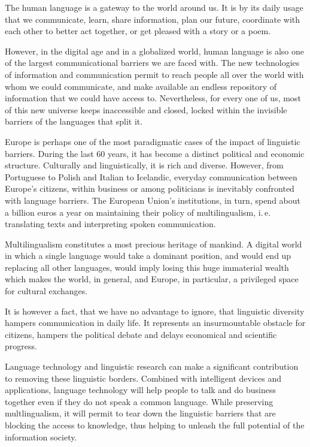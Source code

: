 \begin{multicols}{2}

The human language is a gateway to the world around us.
It is by its daily usage that we communicate, learn, share information,
plan our future, coordinate with each other to better act together,
or get pleased with a story or a poem.

However, in the digital age and in a globalized world, human language is also
one of the largest communicational barriers we are faced with.
The new technologies of information and communication permit to reach people
all over the world with whom we could communicate, and make available
an endless repository of information that we could have access to.
Nevertheless, for every one of us, most of this new universe
keeps inaccessible and closed, locked within the invisible
barriers of the languages that split it.

Europe is perhaps one of the most paradigmatic cases of the impact
of linguistic barriers. 
During the last 60 years, it has become a distinct political and economic structure. 
Culturally and linguistically, it is rich and diverse. However, from Portuguese to Polish 
and Italian to Icelandic, everyday communication between Europe’s citizens, within business 
or among politicians is inevitably confronted with language barriers. 
The European Union's institutions, in turn, spend about a billion euros a year on 
maintaining their policy of multilingualism, i.\,e. trans\-la\-ting texts and interpreting spoken communication.

Multilingualism constitutes a most precious heritage of mankind.
A digital world in which a single language would take a dominant position, and would end up
replacing all other languages,
would imply losing this huge immaterial wealth
which makes the world, in general, and Europe, in particular, a privileged
space for cultural exchanges.

It is however a fact, that we have no advantage to ignore, that linguistic diversity
hampers communication in daily life. It represents an insurmountable obsta\-cle for citizens,
hampers the political debate and delays economical and scientific progress.

Language technology and linguistic research can make a significant contribution to removing these linguistic borders. 
Combined with intelligent devices and applications, language technology will help people to talk and do business together 
even if they do not speak a common language. While preserving multlingualism,
it will permit to tear down the linguistic barriers that are blocking the access to knowledge,
thus helping to unleash the full potential of the information society.


\end{multicols}
